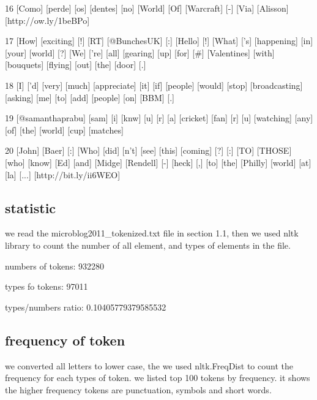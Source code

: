 \documentclass[a4paper, 11pt]{article}
\begin{document}
\begin{spverbatim}
16 [Como] [perde] [os] [dentes] [no] [World] [Of] [Warcraft] [-] [Via] [Alisson] [http://ow.ly/1beBPo] 

17 [How] [exciting] [!] [RT] [@BunchesUK] [:] [Hello] [!] [What] ['s] [happening] [in] [your] [world] [?] [We] ['re] [all] [gearing] [up] [for] [#] [Valentines] [with] [bouquets] [flying] [out] [the] [door] [.] 

18 [I] ['d] [very] [much] [appreciate] [it] [if] [people] [would] [stop] [broadcasting] [asking] [me] [to] [add] [people] [on] [BBM] [.] 

19 [@samanthaprabu] [sam] [i] [knw] [u] [r] [a] [cricket] [fan] [r] [u] [watching] [any] [of] [the] [world] [cup] [matches] 

20 [John] [Baer] [:] [Who] [did] [n't] [see] [this] [coming] [?] [:] [TO] [THOSE] [who] [know] [Ed] [and] [Midge] [Rendell] [-] [heck] [,] [to] [the] [Philly] [world] [at] [la] [...] [http://bit.ly/ii6WEO]
\end{spverbatim}

\subsection{statistic}
we read the microblog2011\_tokenized.txt file in section 1.1, then we used nltk library to count the number of all element, and types of elements in the file.

numbers of tokens: 932280

types fo tokens: 97011

types/numbers ratio: 0.10405779379585532

\subsection{frequency of token}
we converted all letters to lower case, the we used nltk.FreqDist to count the frequency for each types of token. we listed top 100 tokens by frequency. it shows the higher frequency tokens are punctuation, symbols and short words. \newline
\end{document}
